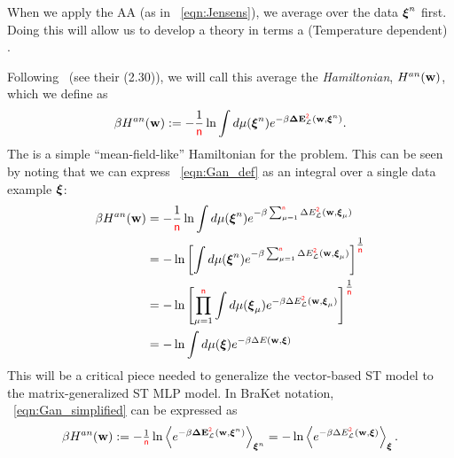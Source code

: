 When we apply the AA (as in \EQN~\ref{eqn:Jensens}), 
we average over the data $\boldsymbol{\xi}^{n}$ first. 
Doing this will allow us to develop a theory in terms a (Temperature dependent) \EffectivePotential. 

Following~\cite{SST92} (see their \EQN(2.30)), we will call this average the \emph{\Annealed Hamiltonian}, $H^{an}({\mathbf{w}})$, 
which we define as  %
  \begin{align}
   \label{eqn:Gan_def}
   \beta H^{an}({\mathbf{w}}):= - \frac{1}{{\color{red}\sf{n}}}\ln  \int d\mu(\boldsymbol{\xi}^{n})e^{-\beta\mathbf{\Delta {E}}^{{\color{red}\sf{2}}}_{\mathcal{L}}(\mathbf{w}, \boldsymbol{\xi}^{n})}.
  \end{align}
The \AnnealedHamiltonian is a simple ``mean-field-like'' Hamiltonian for the problem.
This can be seen by noting that we can express \EQN~\ref{eqn:Gan_def} as an integral over a single data example $\boldsymbol{\xi}$:
 \begin{align}
   \nonumber
   \beta H^{an}({\mathbf{w}}) &=  - \frac{1}{{\color{red}\sf{n}}}\ln  \int d\mu(\boldsymbol{\xi}^{n})e^{-\beta\sum_{\mu=1}^{{\color{red}\sf{n}}}\Delta E^{{\color{red}\sf{2}}}_{\mathcal{L}}({\mathbf{w}},\boldsymbol{\xi}_{\mu})} \\ \nonumber
   &=  - \ln \left[\int d\mu(\boldsymbol{\xi}^{n})e^{-\beta\sum_{\mu=1}^{{\color{red}\sf{n}}}\Delta E^{{\color{red}\sf{2}}}_{\mathcal{L}}({\mathbf{w}},\boldsymbol{\xi}_{\mu})}\right]^{\tfrac{1}{{\color{red}\sf{n}}}} \\ \nonumber
   &=  - \ln \left[\prod_{\mu=1}^{{\color{red}\sf{n}}}\int d\mu(\boldsymbol{\xi}_{\mu})e^{-\beta\Delta E^{{\color{red}\sf{2}}}_{\mathcal{L}}({\mathbf{w}},\boldsymbol{\xi}_{\mu})}\right]^{\tfrac{1}{{\color{red}\sf{n}}}} \\ 
   \label{eqn:Gan_simplified}
   &=  - \ln  \int d\mu(\boldsymbol{\xi})e^{-\beta\Delta E({\mathbf{w}},\boldsymbol{\xi})}
 \end{align}
This will be a critical piece needed to generalize the vector-based ST \Perceptron model to the matrix-generalized ST MLP model.
In BraKet notation, \EQN~\ref{eqn:Gan_simplified} can be expressed as
\begin{eqnarray*}
    \beta H^{an}({\mathbf{w}}):=  -\tfrac{1}{{\color{red}\sf{n}}}\ln\left\langle e^{-\beta\mathbf{\Delta {E}}^{{\color{red}\sf{2}}}_{\mathcal{L}}(\mathbf{w}, \boldsymbol{\xi}^{n})}\right\rangle_{\boldsymbol{\xi}^{n}}= 
    -\ln \left\langle e^{-\beta\Delta E^{{\color{red}\sf{2}}}_{\mathcal{L}}(\mathbf{w},\boldsymbol{\xi})}\right\rangle_{\boldsymbol{\xi}}.
\end{eqnarray*}


